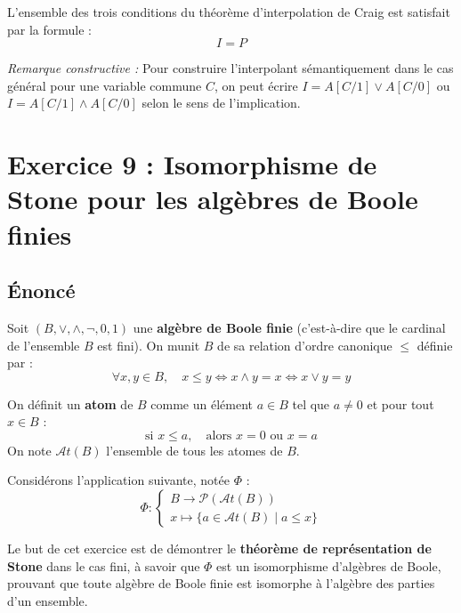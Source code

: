 \documentclass[11pt,a4paper]{article}
\begin{document}
L'ensemble des trois conditions du théorème d'interpolation de Craig est
satisfait par la formule : \[I = P\]

\emph{Remarque constructive :} Pour construire l'interpolant
sémantiquement dans le cas général pour une variable commune \(C\), on
peut écrire \(I = A[C/1] \lor A[C/0]\) ou \(I = A[C/1] \land A[C/0]\)
selon le sens de l'implication.
\n
\hypertarget{exercice-9-isomorphisme-de-stone-pour-les-alguxe8bres-de-boole-finies}{%
\section{Exercice 9 : Isomorphisme de Stone pour les algèbres de Boole
finies}\label{exercice-9-isomorphisme-de-stone-pour-les-alguxe8bres-de-boole-finies}}

\hypertarget{uxe9noncuxe9}{%
\subsection{Énoncé}\label{uxe9noncuxe9}}

Soit \((B, \lor, \land, \neg, 0, 1)\) une \textbf{algèbre de Boole
finie} (c'est-à-dire que le cardinal de l'ensemble \(B\) est fini). On
munit \(B\) de sa relation d'ordre canonique \(\le\) définie par :
\[\forall x, y \in B, \quad x \le y \iff x \land y = x \iff x \lor y = y\]

On définit un \textbf{atom} de \(B\) comme un élément \(a \in B\) tel
que \(a \neq 0\) et pour tout \(x \in B\) :
\[\text{si } x \le a, \quad \text{alors } x = 0 \text{ ou } x = a\] On
note \(\mathcal{A}t(B)\) l'ensemble de tous les atomes de \(B\).

Considérons l'application suivante, notée \(\Phi\) :
\[\Phi : \begin{cases} B \to \mathcal{P}(\mathcal{A}t(B)) \\ x \mapsto \{a \in \mathcal{A}t(B) \mid a \le x\} \end{cases}\]

Le but de cet exercice est de démontrer le \textbf{théorème de
représentation de Stone} dans le cas fini, à savoir que \(\Phi\) est un
isomorphisme d'algèbres de Boole, prouvant que toute algèbre de Boole
finie est isomorphe à l'algèbre des parties d'un ensemble.
\end{document}
